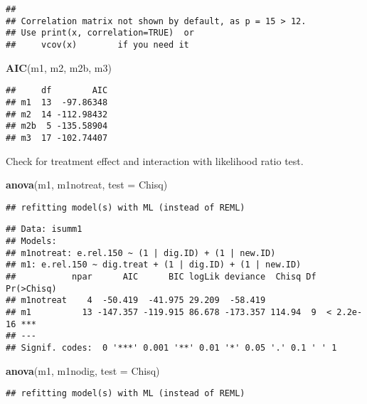 \documentclass[
]{article}
\newenvironment{Shaded}{\begin{snugshade}}{\end{snugshade}}
\newcommand{\AttributeTok}[1]{\textcolor[rgb]{0.13,0.29,0.53}{#1}}
\newcommand{\FunctionTok}[1]{\textcolor[rgb]{0.13,0.29,0.53}{\textbf{#1}}}
\newcommand{\NormalTok}[1]{#1}
\newcommand{\StringTok}[1]{\textcolor[rgb]{0.31,0.60,0.02}{#1}}
\begin{document}
\begin{verbatim}
## 
## Correlation matrix not shown by default, as p = 15 > 12.
## Use print(x, correlation=TRUE)  or
##     vcov(x)        if you need it
\end{verbatim}

\begin{Shaded}
\begin{Highlighting}[]
\FunctionTok{AIC}\NormalTok{(m1, m2, m2b, m3)}
\end{Highlighting}
\end{Shaded}

\begin{verbatim}
##     df        AIC
## m1  13  -97.86348
## m2  14 -112.98432
## m2b  5 -135.58904
## m3  17 -102.74407
\end{verbatim}

Check for treatment effect and interaction with likelihood ratio test.

\begin{Shaded}
\begin{Highlighting}[]
\FunctionTok{anova}\NormalTok{(m1, m1notreat, }\AttributeTok{test =} \StringTok{\textquotesingle{}Chisq\textquotesingle{}}\NormalTok{)}
\end{Highlighting}
\end{Shaded}

\begin{verbatim}
## refitting model(s) with ML (instead of REML)
\end{verbatim}

\begin{verbatim}
## Data: isumm1
## Models:
## m1notreat: e.rel.150 ~ (1 | dig.ID) + (1 | new.ID)
## m1: e.rel.150 ~ dig.treat + (1 | dig.ID) + (1 | new.ID)
##           npar      AIC      BIC logLik deviance  Chisq Df Pr(>Chisq)    
## m1notreat    4  -50.419  -41.975 29.209  -58.419                         
## m1          13 -147.357 -119.915 86.678 -173.357 114.94  9  < 2.2e-16 ***
## ---
## Signif. codes:  0 '***' 0.001 '**' 0.01 '*' 0.05 '.' 0.1 ' ' 1
\end{verbatim}

\begin{Shaded}
\begin{Highlighting}[]
\FunctionTok{anova}\NormalTok{(m1, m1nodig, }\AttributeTok{test =} \StringTok{\textquotesingle{}Chisq\textquotesingle{}}\NormalTok{)}
\end{Highlighting}
\end{Shaded}

\begin{verbatim}
## refitting model(s) with ML (instead of REML)
\end{verbatim}
\end{document}

